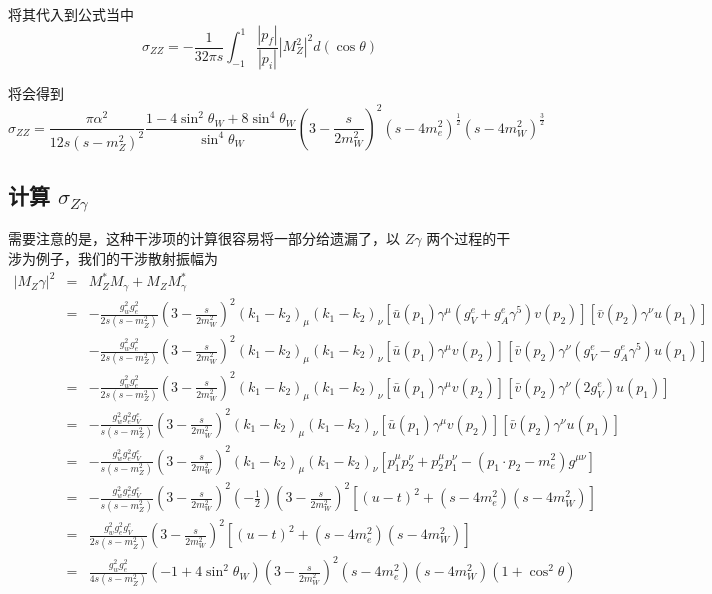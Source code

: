 \documentclass{article}
\begin{document}
将其代入到公式当中
\begin{equation*}
    \sigma_{ZZ} = -\frac{1}{32 \pi s} \int_{-1}^{1} \frac{|p_f|}{|p_i|} \left|M_Z^2\right|^2 d(\cos{\theta})
\end{equation*}

将会得到
\begin{equation}
    \sigma_{ZZ} = \frac{\pi \alpha^2}{12s\left(s - m_Z^2\right)^2}\frac{1 - 4\sin^2{\theta_W} + 8\sin^4{\theta_W}}{\sin^4{\theta_W}}\left(3 - \frac{s}{2m_W^2}\right)^2 \left(s - 4m_e^2 \right)^{\frac{1}{2}}\left(s - 4m_W^2\right)^{\frac{3}{2}}
\end{equation}






\subsection{计算 $\sigma_{Z\gamma}$}
需要注意的是，这种干涉项的计算很容易将一部分给遗漏了，以 $Z \gamma$ 两个过程的干涉为例子，我们的干涉散射振幅为
\begin{eqnarray*}
    \left|M_Z\gamma\right|^2 &=& M_Z^* M_\gamma + M_Z M_\gamma^* \\
    &=& -\frac{g_w^2g_e^2}{2s(s-m_Z^2)}\left(3 - \frac{s}{2 m_W^2}\right)^2(k_1 - k_2)_\mu (k_1 - k_2)_\nu \left[\bar{u}(p_1)\gamma^\mu \left(g_V^e + g_A^e \gamma^5\right) v(p_2)\right]\left[\bar{v}(p_2)\gamma^\nu u(p_1)\right] \\
    && -\frac{g_w^2g_e^2}{2s(s-m_Z^2)}\left(3 - \frac{s}{2 m_W^2}\right)^2(k_1 - k_2)_\mu (k_1 - k_2)_\nu \left[\bar{u}(p_1)\gamma^\mu  v(p_2)\right]\left[\bar{v}(p_2)\gamma^\nu \left(g_V^e - g_A^e \gamma^5\right) u(p_1)\right] \\
    &=& -\frac{g_w^2g_e^2}{2s(s-m_Z^2)}\left(3 - \frac{s}{2 m_W^2}\right)^2(k_1 - k_2)_\mu (k_1 - k_2)_\nu \left[\bar{u}(p_1)\gamma^\mu  v(p_2)\right]\left[\bar{v}(p_2)\gamma^\nu \left(2g_V^e\right) u(p_1)\right] \\
    &=& -\frac{g_w^2 g_e^2 g_V^e}{s(s-m_Z^2)}\left(3 - \frac{s}{2 m_W^2}\right)^2(k_1 - k_2)_\mu (k_1 - k_2)_\nu \left[\bar{u}(p_1)\gamma^\mu  v(p_2)\right]\left[\bar{v}(p_2)\gamma^\nu u(p_1)\right] \\
    &=& -\frac{g_w^2 g_e^2 g_V^e}{s(s-m_Z^2)}\left(3 - \frac{s}{2 m_W^2}\right)^2(k_1 - k_2)_\mu (k_1 - k_2)_\nu \left[p_1^\mu p_2^\nu + p_2^\mu p_1^\nu - \left(p_1 \cdot p_2 - m_e^2\right)g^{\mu\nu}\right] \\
    &=& -\frac{g_w^2 g_e^2 g_V^e}{s(s-m_Z^2)}\left(3 - \frac{s}{2 m_W^2}\right)^2(-\frac{1}{2})\left(3 - \frac{s}{2m_W^2}\right)^2\left[(u - t)^2 + \left(s - 4m_e^2 \right)\left(s - 4m_W^2\right)\right] \\
    &=& \frac{g_w^2 g_e^2 g_V^e}{2s(s-m_Z^2)}\left(3 - \frac{s}{2m_W^2}\right)^2\left[(u - t)^2 + \left(s - 4m_e^2 \right)\left(s - 4m_W^2\right)\right] \\
    &=& \frac{g_w^2 g_e^2 }{4s(s-m_Z^2)}\left(-1 + 4 \sin^2{\theta_W}\right)\left(3 - \frac{s}{2m_W^2}\right)^2 \left(s - 4m_e^2 \right)\left(s - 4m_W^2\right) \left(1 + \cos^2{\theta}\right)
\end{eqnarray*}
\end{document}
